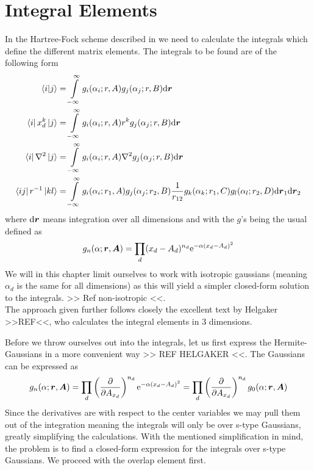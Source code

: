 \section{Integral Elements}
    In the Hartree-Fock scheme described in  we need to
    calculate the integrals which define the different matrix elements. The
    integrals to be found are of the following form
        \begin{equation}
            \begin{aligned}
                \braket{i}{j} &= \int\limits^{\infty}_{-\infty} g_i(\alpha_i;r,A)g_j(\alpha_j;r,B) \mathrm{d}
                \boldsymbol{{r}} \\
                \bra{i}x^k_d\ket{j} &= \int\limits^{\infty}_{-\infty} g_i(\alpha_i;r,A) r^k
                g_j(\alpha_j;r,B) \mathrm{d} \boldsymbol{{r}} \\
                \bra{i}\nabla^2\ket{j} &= \int\limits^{\infty}_{-\infty} g_i(\alpha_i;r,A)\nabla^2
                g_j(\alpha_j;r,B) \mathrm{d} \boldsymbol{{r}} \\
                \bra{ij}r^{-1}\ket{kl} &= \int\limits^{\infty}_{-\infty}
                g_i(\alpha_i;r_1,A)g_j(\alpha_j;r_2,B) \frac{1}{r_{12}}
                g_k(\alpha_k;r_1,C)g_l(\alpha_l;r_2,D) \mathrm{d} \boldsymbol{{r}}_1 \mathrm{d}
                \boldsymbol{{r}}_2\\
            \end{aligned}
        \end{equation}
    where $\mathrm{d}\boldsymbol{{r}}$ means integration over all dimensions and with the
    $g$'s being the usual  defined as
        \begin{equation}
            g_n(\alpha;\boldsymbol{{r}},\boldsymbol{{A}}) = \prod_d (x_d-A_d)^{n_d}
            \mathrm{e}^{-\alpha (x_d-A_d)^2}
            \label{eq:hermiteGauss2}
        \end{equation}
    We will in this chapter limit ourselves to work with isotropic gaussians
    (meaning $\alpha_d$ is the same for all dimensions) as this will yield a
    simpler closed-form solution to the integrals. >> Ref non-isotropic <<. \\
    The approach given further follows closely the excellent text by Helgaker
    >>REF<<, who calculates the integral elements in 3 dimensions.

    Before we throw ourselves out into the integrals, let us first express the
    Hermite-Gaussians in a more convenient way >> REF HELGAKER <<. The
    Gaussians can be expressed as
        \begin{equation}
            g_n(\alpha;\boldsymbol{{r}},\boldsymbol{{A}}) = \prod_d  \left(\frac{\mathrm{\partial}}{\mathrm{\partial} A_{x_d}}\right)^{n_d}
            \mathrm{e}^{-\alpha (x_d-A_d)^2} = \prod_d \left(\frac{\mathrm{\partial}}{\mathrm{\partial} A_{x_d}}\right)^{n_d}
            g_0(\alpha;\boldsymbol{{r}},\boldsymbol{{A}})
            \label{eq:centerDerGauss}
        \end{equation}
    Since the derivatives are with respect to the center variables we may pull
    them out of the integration meaning the integrals will only be over s-type
    Gaussians, greatly simplifying the calculations. With the mentioned
    simplification in mind, the problem is to find a closed-form expression for
    the integrals over s-type Gaussians. We proceed with the overlap element first.

